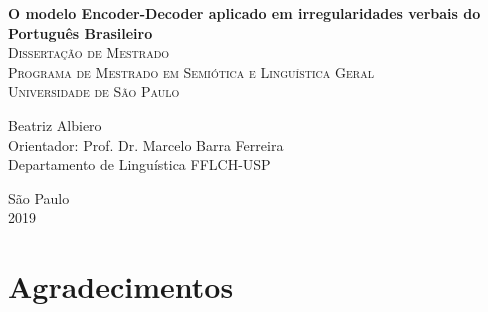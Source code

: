 \documentclass[12pt,twoside,a4paper]{book}
\begin{document}
\frontmatter 
\fancyhead[RO]{{\footnotesize\rightmark}\hspace{2em}\thepage}
\setcounter{tocdepth}{2}
\fancyhead[LE]{\thepage\hspace{2em}\footnotesize{\leftmark}}
\fancyhead[RE,LO]{}
\fancyhead[RO]{{\footnotesize\rightmark}\hspace{2em}\thepage}


\onehalfspacing  %

\thispagestyle{empty}
\begin{center}
    \vspace*{2.3cm}
    \textbf{\Large{O modelo Encoder-Decoder aplicado em irregularidades verbais do Português Brasileiro
}}\\
    
    
    \vskip 2cm
    \textsc{
    Dissertação de Mestrado\\[+0.5cm]
    Programa de Mestrado em Semiótica e Linguística Geral\\[+0.5cm]
    Universidade de São Paulo\\[+0.5cm]
   }
    
    \vspace*{6.2cm}
    Beatriz Albiero\\
    Orientador: Prof. Dr. Marcelo Barra Ferreira\\
    Departamento de Linguística FFLCH-USP
    
    \vskip 0.5cm
    \normalsize{São Paulo\\ 2019}
\end{center}





\chapter*{Agradecimentos}
\thispagestyle{empty}

\end{document}
